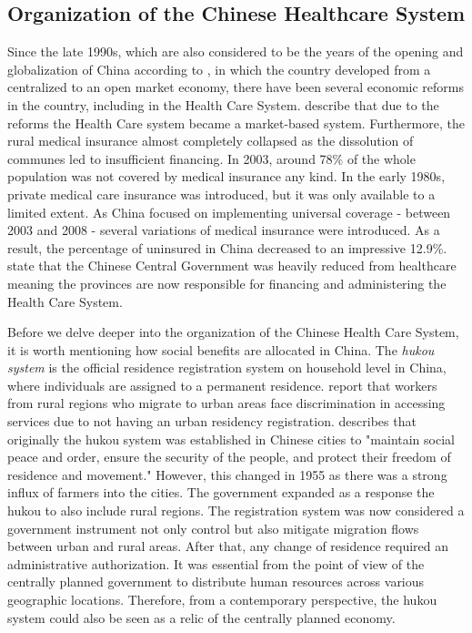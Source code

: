 \documentclass[
]{article}
\begin{document}
	\subsection{Organization of the Chinese Healthcare System} \label{orga} 
	Since the late 1990s, which are also considered to be the years of the opening and globalization of China according to \cite{kanbur_fifty_2005} , in which the country developed from a centralized to an open market economy, there have been several economic reforms in the country, including in the Health Care System.
    \cite{shi_health_2018} describe that due to the reforms the Health Care system became a market-based system. Furthermore, the rural medical insurance almost completely collapsed as the dissolution of communes led to insufficient financing. In 2003, around 78\% of the whole population was not covered by medical insurance any kind. In the early 1980s, private medical care insurance was introduced, but it was only available to a limited extent. 
	As China focused on implementing universal coverage - between 2003 and 2008 - several variations of medical insurance were introduced. As a result, the percentage of uninsured in China decreased to an impressive 12.9\%. 
	 \cite{hougaard_chinese_2011} state that the Chinese Central Government was heavily reduced from healthcare meaning the provinces are now responsible for financing and administering the Health Care System. \par
	Before we delve deeper into the organization of the Chinese Health Care System, it is worth mentioning how social benefits are allocated in China.
	The \textit{hukou system} is the official residence registration system on household level in China, where individuals are assigned to a permanent residence.
	\cite{noauthor_oecd_nodate} report that workers from rural regions who migrate to urban areas face discrimination in accessing services due to not having an urban residency registration. 
	\cite{liu_institution_2005} describes  that originally the hukou system was established in Chinese cities to "maintain social peace and order, ensure the security of the people, and protect their freedom of residence and movement." 
	However, this changed in 1955 as there was a strong influx of farmers into the cities. The government expanded as a response the hukou to also include rural regions.  
    The registration system was now considered a government instrument not only control but also mitigate migration flows between urban and rural areas. After that, any change of residence required an administrative authorization. It was essential from the point of view of the centrally planned government to distribute human resources across various geographic locations. Therefore, from a contemporary perspective, the hukou system could also be seen as a relic of the centrally planned economy.
\end{document}
